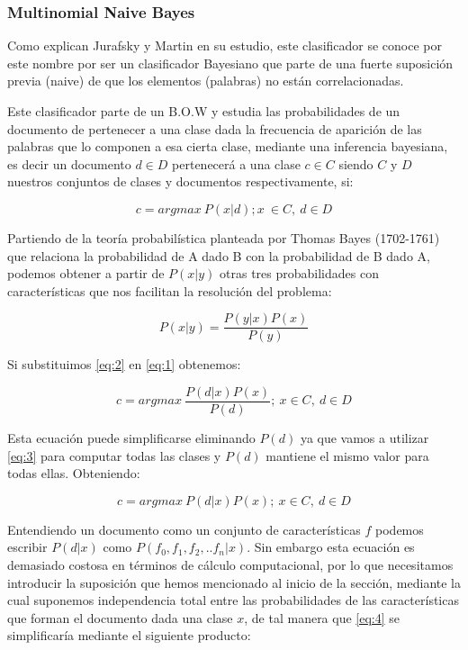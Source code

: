 \subsubsection{Multinomial Naive Bayes}\label{mb}

Como explican Jurafsky y Martin \cite{NaiveBayes} en su estudio, este clasificador se conoce por este nombre por ser un clasificador Bayesiano que parte de una fuerte suposición previa (naive) de que los elementos (palabras) no están correlacionadas.

Este clasificador parte de un B.O.W y estudia las probabilidades de un documento de pertenecer a una clase dada la frecuencia de aparición de las palabras que lo componen a esa cierta clase, mediante una inferencia bayesiana, es decir un documento \(d \in D\) pertenecerá a una clase \(c \in C\) siendo \(C\) y \(D\) nuestros conjuntos de clases y documentos respectivamente, si:

\begin{equation} \label{eq:1}
\mathit{c = argmax\ P(x|d); x\ \in C,\ d \in D} 
\end{equation}

Partiendo de la teoría probabilística planteada por Thomas Bayes (1702-1761) que relaciona la probabilidad de A dado B con la probabilidad de B dado A, podemos obtener a partir de \(P(x|y)\) otras tres probabilidades con características que nos facilitan la resolución del problema:

\begin{equation} \label{eq:2}
\mathit{P(x|y) = \frac{P(y|x)P(x)}{P(y)}}
\end{equation}

Si substituimos \ref{eq:2} en \ref{eq:1} obtenemos:

\begin{equation} \label{eq:3}
\mathit{c = argmax\ \frac{P(d|x)P(x)}{P(d)};\ x \in C,\ d \in D}
\end{equation}

Esta ecuación puede simplificarse eliminando \(P(d)\) ya que vamos a utilizar \ref{eq:3} para computar todas las clases y \(P(d)\) mantiene el mismo valor para todas ellas. Obteniendo:

\begin{equation} \label{eq:4}
\mathit{c = argmax\ P(d|x)P(x);\ x \in C,\ d \in D}
\end{equation}

Entendiendo un documento como un conjunto de características \(f\) podemos escribir  \(P(d|x)\) como \(P(f_0,f_1,f_2,..f_n|x)\).
Sin embargo esta ecuación es demasiado costosa en términos de cálculo computacional, por lo que necesitamos introducir la suposición que hemos mencionado al inicio de la sección, mediante la cual suponemos independencia total entre las probabilidades de las características  que forman el documento dada una clase \(x\), de tal manera que \ref{eq:4} se simplificaría mediante el siguiente producto:

